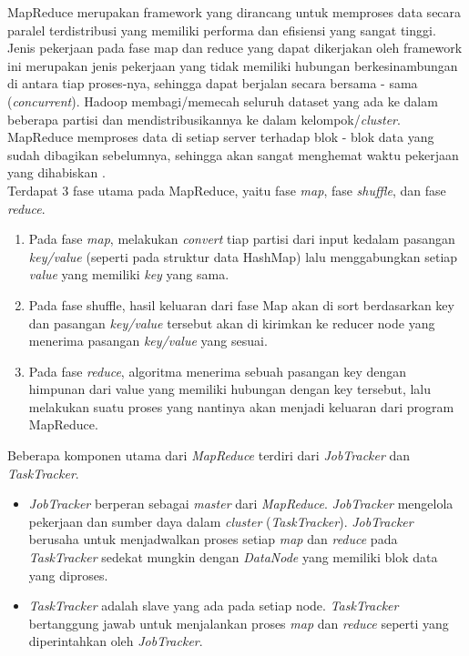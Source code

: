 		MapReduce merupakan framework yang dirancang untuk memproses data secara paralel terdistribusi yang memiliki performa dan efisiensi yang sangat tinggi. Jenis pekerjaan pada fase map dan reduce yang dapat dikerjakan oleh framework ini merupakan jenis pekerjaan yang tidak memiliki hubungan berkesinambungan di antara  tiap proses-nya, sehingga dapat berjalan secara bersama - sama (\textit{concurrent}). Hadoop membagi/memecah seluruh dataset yang ada ke dalam beberapa partisi dan mendistribusikannya ke dalam kelompok/\textit{cluster}. MapReduce memproses data di setiap server terhadap blok - blok data yang sudah dibagikan sebelumnya, sehingga akan sangat menghemat waktu pekerjaan yang dihabiskan \cite{Lam:2010:HA:1965594}. \\
		Terdapat 3 fase utama pada MapReduce, yaitu fase \textit{map}, fase \textit{shuffle}, dan fase \textit{reduce}. 
		\begin{enumerate}
			\item Pada fase \textit{map}, melakukan \textit{convert} tiap partisi dari input kedalam pasangan \textit{key/value} (seperti pada struktur data HashMap) lalu menggabungkan setiap \textit{value} yang memiliki \textit{key} yang sama.
			\item Pada fase shuffle, hasil keluaran dari fase Map akan di sort berdasarkan key dan pasangan \textit{key/value} tersebut akan di kirimkan ke reducer node yang menerima pasangan \textit{key/value} yang sesuai.
			\item Pada fase \textit{reduce}, algoritma menerima sebuah pasangan key dengan himpunan dari value yang memiliki hubungan dengan key tersebut, lalu melakukan suatu proses yang nantinya akan menjadi keluaran dari program MapReduce.
		\end{enumerate} 
		
	Beberapa komponen utama dari \textit{MapReduce} terdiri dari \textit{JobTracker} dan \textit{TaskTracker}.
	\begin{itemize}
		\item \textit{JobTracker} berperan sebagai \textit{master} dari \textit{MapReduce}. \textit{JobTracker} mengelola pekerjaan dan sumber daya dalam \textit{cluster} (\textit{TaskTracker}). \textit{JobTracker} berusaha untuk menjadwalkan proses setiap \textit{map} dan \textit{reduce} pada \textit{TaskTracker} sedekat mungkin dengan \textit{DataNode} yang memiliki blok data yang diproses.
		\item \textit{TaskTracker} adalah slave yang ada pada setiap node. \textit{TaskTracker} bertanggung jawab untuk menjalankan proses \textit{map} dan \textit{reduce} seperti yang diperintahkan oleh \textit{JobTracker}.
	\end{itemize}
		
